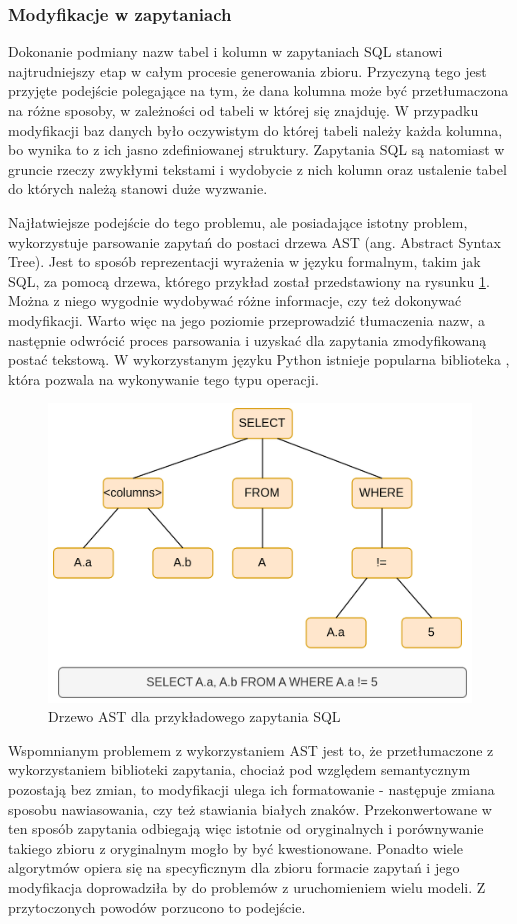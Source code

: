 \subsubsection{Modyfikacje w zapytaniach}
Dokonanie podmiany nazw tabel i kolumn w zapytaniach SQL stanowi najtrudniejszy etap w całym procesie generowania zbioru. Przyczyną tego jest przyjęte podejście polegające na tym, że dana kolumna może być przetłumaczona na różne sposoby, w zależności od tabeli w której się znajduję. W przypadku modyfikacji baz danych było oczywistym do której tabeli należy każda kolumna, bo wynika to z ich jasno zdefiniowanej struktury. Zapytania SQL są natomiast w gruncie rzeczy zwykłymi tekstami i wydobycie z nich kolumn oraz ustalenie tabel do których należą stanowi duże wyzwanie.

Najłatwiejsze podejście do tego problemu, ale posiadające istotny problem, wykorzystuje parsowanie zapytań do postaci drzewa AST (ang. Abstract Syntax Tree). Jest to sposób reprezentacji wyrażenia w języku formalnym, takim jak SQL, za pomocą drzewa, którego przykład został przedstawiony na rysunku \ref{fig:ast-example}. Można z niego wygodnie wydobywać różne informacje, czy też dokonywać modyfikacji. Warto więc na jego poziomie przeprowadzić tłumaczenia nazw, a następnie odwrócić proces parsowania i uzyskać dla zapytania zmodyfikowaną postać tekstową. W wykorzystanym języku Python istnieje popularna biblioteka , która pozwala na wykonywanie tego typu operacji. 

\begin{figure}[ht!]
  \centering
  \includegraphics[width=0.6\linewidth]{images/ast_example.png}
  \caption{Drzewo AST dla przykładowego zapytania SQL}
  \label{fig:ast-example}
\end{figure}

Wspomnianym problemem z wykorzystaniem AST jest to, że przetłumaczone z wykorzystaniem biblioteki  zapytania, chociaż pod względem semantycznym pozostają bez zmian, to modyfikacji ulega ich formatowanie - następuje zmiana sposobu nawiasowania, czy też stawiania białych znaków. Przekonwertowane w ten sposób zapytania odbiegają więc istotnie od oryginalnych i porównywanie takiego zbioru z oryginalnym  mogło by być kwestionowane. Ponadto wiele algorytmów opiera się na specyficznym dla zbioru  formacie zapytań i jego modyfikacja doprowadziła by do problemów z uruchomieniem wielu modeli. Z przytoczonych powodów porzucono to podejście.

